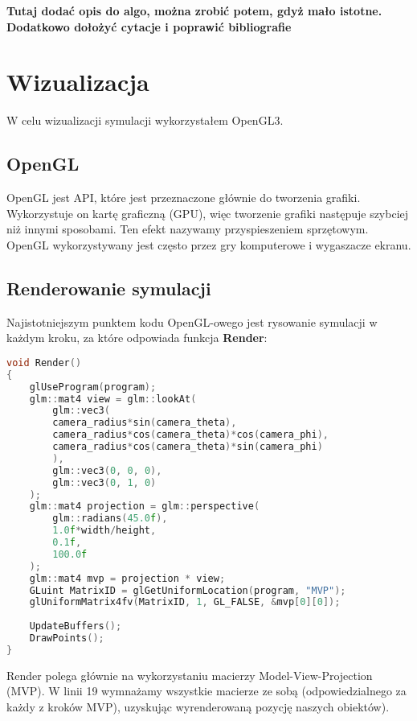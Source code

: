 \documentclass[14pt,twoside,a4paper]{article}
\theoremstyle{definition}
\begin{document}
\textbf{Tutaj dodać opis do algo, można zrobić potem, gdyż mało istotne. Dodatkowo dołożyć cytacje i poprawić bibliografie}

\section{\LARGE Wizualizacja}
	
W celu wizualizacji symulacji wykorzystałem OpenGL3. 

\subsection{\large OpenGL}
OpenGL \cite{opengl} jest API, które jest przeznaczone głównie do tworzenia grafiki. 
Wykorzystuje on kartę graficzną (GPU), więc tworzenie grafiki następuje szybciej niż innymi sposobami. Ten efekt nazywamy przyspieszeniem sprzętowym. OpenGL wykorzystywany jest często przez gry komputerowe i wygaszacze ekranu.

\subsection{\large Renderowanie symulacji}

Najistotniejszym punktem kodu OpenGL-owego jest rysowanie symulacji w każdym kroku, za które odpowiada funkcja \textbf{Render}:
\begin{lstlisting}[language=C++, frame=single, framerule=2pt, caption=Pseudokod renderowania symulacji]
void Render() 
{
    glUseProgram(program);
    glm::mat4 view = glm::lookAt(
        glm::vec3(
        camera_radius*sin(camera_theta),
        camera_radius*cos(camera_theta)*cos(camera_phi),
        camera_radius*cos(camera_theta)*sin(camera_phi)
        ),
        glm::vec3(0, 0, 0),
        glm::vec3(0, 1, 0)
    );
    glm::mat4 projection = glm::perspective(
        glm::radians(45.0f),
        1.0f*width/height,
        0.1f,
        100.0f
    );
    glm::mat4 mvp = projection * view;
    GLuint MatrixID = glGetUniformLocation(program, "MVP");
    glUniformMatrix4fv(MatrixID, 1, GL_FALSE, &mvp[0][0]);
    
    UpdateBuffers();
    DrawPoints();
}
\end{lstlisting}
\bigskip

Render polega głównie na wykorzystaniu macierzy Model-View-Projection (MVP). 
W linii 19 wymnażamy wszystkie macierze ze sobą (odpowiedzialnego za każdy z kroków MVP), uzyskując wyrenderowaną pozycję naszych obiektów).\\
\end{document}

